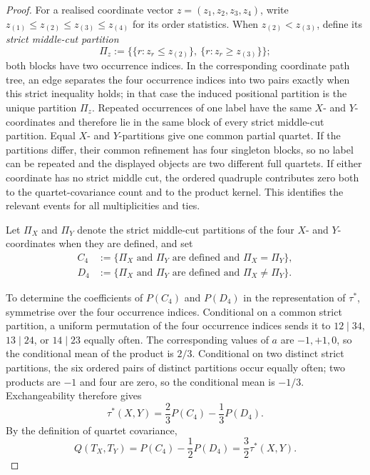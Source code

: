 \documentclass[12pt]{article}
\begin{document}
\begin{proof}
For a realised coordinate vector $z=(z_1,z_2,z_3,z_4)$, write
$z_{(1)}\le z_{(2)}\le z_{(3)}\le z_{(4)}$ for its order statistics.  When
$z_{(2)}<z_{(3)}$, define its \emph{strict middle-cut partition}
\begin{equation}\label{eq:strict-middle-cut}
\Pi_z:=
\bigl\{\{r:z_r\le z_{(2)}\},\ \{r:z_r\ge z_{(3)}\}\bigr\};
\end{equation}
both blocks have two occurrence indices.  In the corresponding coordinate
path tree, an edge separates the four occurrence indices into two pairs
exactly when this strict inequality holds; in that case the induced positional
partition is the unique partition $\Pi_z$.  Repeated
occurrences of one label have the same $X$- and $Y$-coordinates and therefore
lie in the same block of every strict middle-cut partition.  Equal $X$- and
$Y$-partitions give one common partial quartet.  If the partitions differ,
their common refinement has four singleton blocks, so no label can be repeated
and the displayed objects are two different full quartets.  If either
coordinate has no strict middle cut, the ordered quadruple contributes zero
both to the quartet-covariance count and to the product kernel.  This identifies
the relevant events for all multiplicities and ties.

Let $\Pi_X$ and $\Pi_Y$ denote the strict middle-cut partitions of the four
$X$- and $Y$-coordinates when they are defined, and set
\begin{equation}\label{eq:concordance-events}
\begin{aligned}
C_4&:=\{\Pi_X\text{ and }\Pi_Y\text{ are defined and }\Pi_X=\Pi_Y\},\\
D_4&:=\{\Pi_X\text{ and }\Pi_Y\text{ are defined and }\Pi_X\ne\Pi_Y\}.
\end{aligned}
\end{equation}

To determine the coefficients of $P(C_4)$ and $P(D_4)$ in the representation
of $\tau^*$, symmetrise over the four occurrence indices.  Conditional on a common
strict partition, a uniform permutation of the four occurrence indices
sends it to $12\mid34$, $13\mid24$, or $14\mid23$ equally often.  The
corresponding values of $a$ are $-1,+1,0$, so the conditional mean of the
product is $2/3$.  Conditional on two distinct strict partitions, the
six ordered pairs of distinct partitions occur equally often; two
products are $-1$ and four are zero, so the conditional mean is $-1/3$.
Exchangeability therefore gives
\begin{equation}\label{eq:display-091}
\tau^*(X,Y)=\frac23P(C_4)-\frac13P(D_4).
\end{equation}
By the definition of quartet covariance,
\begin{equation}\label{eq:path-Q-tau-star}
Q(T_X,T_Y)=P(C_4)-\frac12P(D_4)=\frac32\tau^*(X,Y).
\end{equation}


\end{proof}
\end{document}
